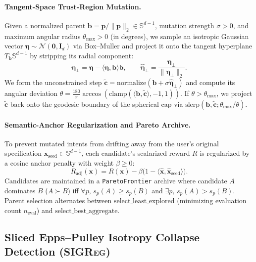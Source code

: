 \documentclass[11pt]{article}
\begin{document}
\paragraph{Tangent-Space Trust-Region Mutation.}
Given a normalized parent $\mathbf{b} = \mathbf{p} / \|\mathbf{p}\|_2 \in \mathbb{S}^{d-1}$, mutation strength $\sigma > 0$, and maximum angular radius $\theta_{\max} > 0$ (in degrees), we sample an isotropic Gaussian vector $\boldsymbol{\eta} \sim \mathcal{N}(\mathbf{0}, \mathbf{I}_d)$ via Box--Muller and project it onto the tangent hyperplane $T_{\mathbf{b}}\mathbb{S}^{d-1}$ by stripping its radial component:
\begin{equation}
\label{eq:tangent-noise}
\boldsymbol{\eta}_{\perp} = \boldsymbol{\eta} - \langle \boldsymbol{\eta}, \mathbf{b} \rangle \mathbf{b}, \qquad \hat{\boldsymbol{\eta}}_{\perp} = \frac{\boldsymbol{\eta}_{\perp}}{\|\boldsymbol{\eta}_{\perp}\|_2}.
\end{equation}
We form the unconstrained step $\tilde{\mathbf{c}} = \text{normalize}(\mathbf{b} + \sigma \hat{\boldsymbol{\eta}}_{\perp})$ and compute its angular deviation $\theta = \frac{180}{\pi}\arccos(\text{clamp}(\langle \mathbf{b}, \tilde{\mathbf{c}} \rangle, -1, 1))$. If $\theta > \theta_{\max}$, we project $\tilde{\mathbf{c}}$ back onto the geodesic boundary of the spherical cap via $\text{slerp}(\mathbf{b}, \tilde{\mathbf{c}}; \theta_{\max} / \theta)$.

\paragraph{Semantic-Anchor Regularization and Pareto Archive.}
To prevent mutated intents from drifting away from the user's original specification $\mathbf{x}_{\text{seed}} \in \mathbb{S}^{d-1}$, each candidate's scalarized reward $R$ is regularized by a cosine anchor penalty with weight $\beta \ge 0$:
\begin{equation}
\label{eq:anchor-penalty}
R_{\text{adj}}(\mathbf{x}) = R(\mathbf{x}) - \beta \bigl(1 - \langle \hat{\mathbf{x}}, \hat{\mathbf{x}}_{\text{seed}} \rangle\bigr).
\end{equation}
Candidates are maintained in a \texttt{ParetoFrontier} archive where candidate $A$ dominates $B$ ($A \succ B$) iff $\forall p,\, s_p(A) \ge s_p(B)$ and $\exists p,\, s_p(A) > s_p(B)$. Parent selection alternates between $\text{select\_least\_explored}$ (minimizing evaluation count $n_{\text{eval}}$) and $\text{select\_best\_aggregate}$.

\subsection{Sliced Epps--Pulley Isotropy Collapse Detection (\textsc{SIGReg})}
\label{sec:sigreg}
\end{document}
